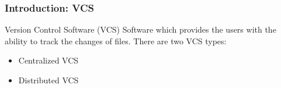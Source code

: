 \begin{frame}

\frametitle{Introduction: VCS}

\begin{block}{Version Control Software (VCS)}
\pause
Software which provides the users with the ability to track the changes of files. There are two VCS types:
\begin{itemize}
\item Centralized VCS
\item Distributed VCS
\end{itemize}
\end{block}

\end{frame}